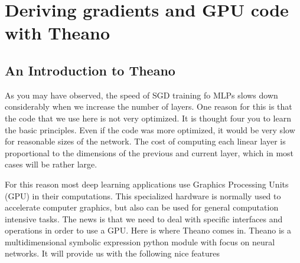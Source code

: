 
%
%
%

\section{Deriving gradients and GPU code with Theano}

\subsection{An Introduction to Theano}

As you may have observed, the speed of SGD training fo MLPs slows down
considerably when we increase the number of layers. One reason for this is that
the code that we use here is not very optimized. It is thought four you to
learn the basic principles. Even if the code was more optimized, it would be
very slow for reasonable sizes of the network. The cost of computing each
linear layer is proportional to the dimensions of the previous and current
layer, which in most cases will be rather large. 

For this reason most deep learning applications use Graphics Processing Units
(GPU) in their computations. This specialized hardware is normally used to
accelerate computer graphics, but also can be used for general computation
intensive tasks. The news is that we need to deal with specific interfaces and
operations in order to use a GPU. Here is where Theano comes in. Theano is a
multidimensional symbolic expression python module with focus on neural
networks. It will provide us with the following nice features

